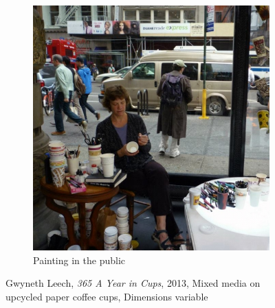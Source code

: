 \begin{figure}[h!]
\begin{subfigure}{.48\textwidth}
  \includegraphics[width=\linewidth]{graphics/Gwyneth-Leech-cup3.jpg}
  \caption{Painting in the public}
  \label{fig:GwynethLeech_Public}
\end{subfigure}
\caption{Gwyneth Leech, \textit{365 A Year in Cups}, 2013, Mixed media on upcycled paper coffee cups, Dimensions variable}
\label{fig:GwynethLeech_CoffeeCups}
\end{figure}

